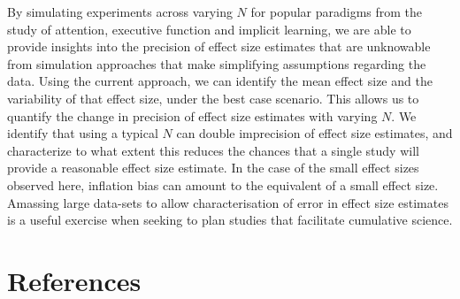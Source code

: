 \documentclass[
  man]{apa6}
\begin{document}
By simulating experiments across varying \(N\) for popular paradigms from the study of attention, executive function and implicit learning, we are able to provide insights into the precision of effect size estimates that are unknowable from simulation approaches that make simplifying assumptions regarding the data. Using the current approach, we can identify the mean effect size and the variability of that effect size, under the best case scenario. This allows us to quantify the change in precision of effect size estimates with varying \(N\). We identify that using a typical \(N\) can double imprecision of effect size estimates, and characterize to what extent this reduces the chances that a single study will provide a reasonable effect size estimate. In the case of the small effect sizes observed here, inflation bias can amount to the equivalent of a small effect size. Amassing large data-sets to allow characterisation of error in effect size estimates is a useful exercise when seeking to plan studies that facilitate cumulative science.

\clearpage

\hypertarget{references}{%
\section{References}\label{references}}

\label{sec:Refref}
\end{document}
